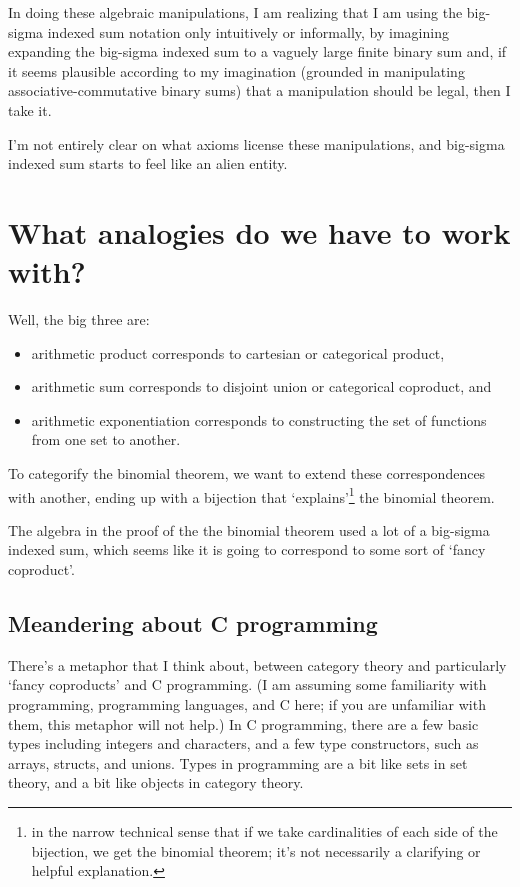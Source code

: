 \documentclass{proc-l}
\theoremstyle{definition}
\theoremstyle{remark}
\numberwithin{equation}{section}
\begin{document}
In doing these algebraic manipulations, I am realizing that I am using the big-sigma indexed sum notation only intuitively or informally,
by imagining expanding the big-sigma indexed sum to a vaguely large finite binary sum and,
if it seems plausible according to my imagination (grounded in manipulating associative-commutative binary sums)
that a manipulation should be legal, then I take it.

I'm not entirely clear on what axioms license these manipulations, and big-sigma indexed sum starts to feel like an alien entity.

\section{What analogies do we have to work with?}

Well, the big three are:
\begin{itemize}
    \item arithmetic product corresponds to cartesian or categorical product,
    \item arithmetic sum corresponds to disjoint union or categorical coproduct, and
    \item arithmetic exponentiation corresponds to constructing the set of functions from one set to another.
\end{itemize}

To categorify the binomial theorem, we want to extend these correspondences with another, ending up with a bijection that `explains'\footnote{in the narrow technical sense that if we take cardinalities of each side of the bijection, we get the
binomial theorem; it's not necessarily a clarifying or helpful explanation.}
the binomial theorem.

The algebra in the proof of the the binomial theorem used a lot of a big-sigma indexed sum, which seems like it is going to correspond to some sort of `fancy coproduct'.

\subsection{Meandering about C programming}

There's a metaphor that I think about, between category theory and particularly `fancy coproducts' and C programming.
(I am assuming some familiarity with programming, programming languages, and C here;
if you are unfamiliar with them, this metaphor will not help.)
In C programming, there are a few basic types including integers and characters,
and a few type constructors, such as arrays, structs, and unions.
Types in programming are a bit like sets in set theory,
and a bit like objects in category theory.
\end{document}
